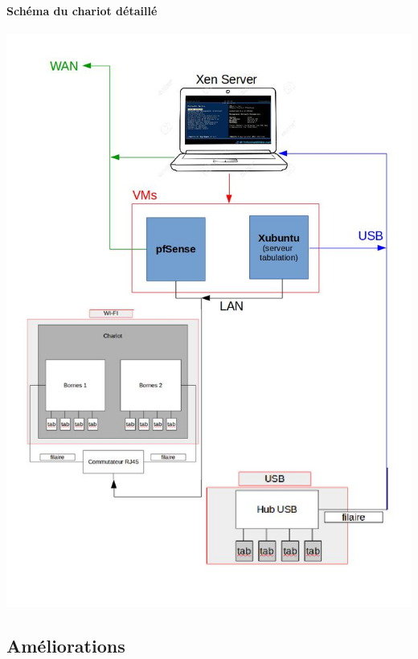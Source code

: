 \documentclass[a4paper,12pt]{extarticle}
\begin{document}
\clearpage
\paragraph{Schéma du chariot détaillé}
\begin{center}
\includegraphics[scale=0.65]{chariot}\\
\end{center}

\subsection{Améliorations}
\end{document}
